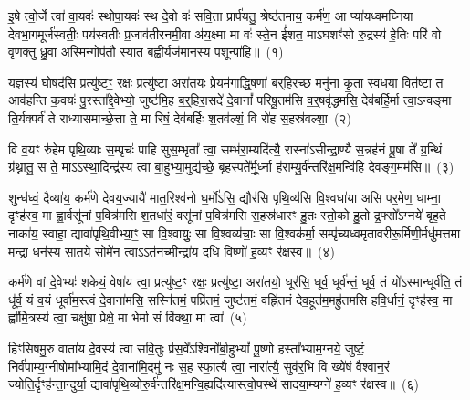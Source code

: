 \setcounter{anuvakam}{0}
इ॒षे त्वो॒र्जे त्वा॑ वा॒यवः॑ स्थोपा॒यवः॑ स्थ दे॒वो वः॑ सवि॒ता प्रार्प॑यतु॒ श्रेष्ठ॑तमाय॒ कर्म॑ण॒ आ प्या॑यध्वमघ्निया देवभा॒गमूर्ज॑स्वतीः॒ पय॑स्वतीः प्र॒जाव॑तीरनमी॒वा अ॑य॒क्ष्मा मा वः॑ स्ते॒न ई॑शत॒ मा\-ऽघशꣳ॑सो रु॒द्रस्य॑ हे॒तिः परि॑ वो वृणक्तु ध्रु॒वा अ॒स्मिन्गोप॑तौ स्यात ब॒ह्वीर्यज॑मानस्य प॒शून्पा॑हि॥~(१)

{\anuvakamend[{इ॒षे त्रिच॑त्वारिꣳशत्}]}

य॒ज्ञस्य॑ घो॒षद॑सि॒ प्रत्यु॑ष्ट॒ꣳ॒ रक्षः॒ प्रत्यु॑ष्टा॒ अरा॑तयः॒ प्रेयम॑गाद्धि॒षणा॑ ब॒र्॒हिरच्छ॒ मनु॑ना कृ॒ता स्व॒धया॒ वित॑ष्टा॒ त आव॑हन्ति क॒वयः॑ पु॒रस्ता᳚द्दे॒वेभ्यो॒ जुष्ट॑मि॒ह ब॒र्॒हिरा॒सदे॑ दे॒वानां᳚ परिषू॒तम॑सि व॒र्॒षवृ॑द्धमसि॒ देव॑बर्\mbox{}हि॒र्मा त्वा॒\-ऽन्वङ्मा ति॒र्यक्पर्व॑ ते राध्यासमाच्छे॒त्ता ते॒ मा रि॑षं॒ देव॑बर्\mbox{}हिः श॒तव॑ल्\mbox{}शं॒ वि रो॑ह स॒हस्र॑वल्\mbox{}शा॒~(२)

वि व॒यꣳ रु॑हेम पृथि॒व्याः स॒म्पृचः॑ पाहि सुस॒म्भृता᳚ त्वा॒ सम्भ॑रा॒म्यदि॑त्यै॒ रास्ना॑\-ऽसीन्द्रा॒ण्यै स॒न्नह॑नं पू॒षा ते᳚ ग्र॒न्थिं ग्र॑थ्नातु॒ स ते॒ मा\-ऽऽ\-स्था॒दिन्द्र॑स्य त्वा बा॒हुभ्या॒मुद्य॑च्छे॒ बृह॒स्पते᳚र्मू॒र्ध्ना ह॑राम्यु॒र्व॑न्तरि॑क्ष॒मन्वि॑हि देवङ्ग॒मम॑सि॥~(३)

{\anuvakamend[{स॒हस्र॑वल्\mbox{}शा अ॒ष्टात्रिꣳ॑शच्च}]}

शुन्ध॑ध्वं॒ दैव्या॑य॒ कर्म॑णे देवय॒ज्यायै॑ मात॒रिश्व॑नो घ॒र्मो॑\-ऽसि॒ द्यौर॑सि पृथि॒व्य॑सि वि॒श्वधा॑या असि पर॒मेण॒ धाम्ना॒ दृꣳह॑स्व॒ मा ह्वा॒र्वसू॑नां प॒वित्र॑मसि श॒तधा॑रं॒ वसू॑नां प॒वित्र॑मसि स॒हस्र॑धारꣳ हु॒तः स्तो॒को हु॒तो द्र॒फ्सो᳚\-ऽग्नये॑ बृह॒ते नाका॑य॒ स्वाहा॒ द्यावा॑\-पृथि॒वीभ्या॒ꣳ॒ सा वि॒श्वायुः॒ सा वि॒श्वव्य॑चाः॒ सा वि॒श्वक॑र्मा॒ सम्पृ॑च्यध्वमृतावरीरू॒र्मिणी॒र्मधु॑मत्तमा म॒न्द्रा धन॑स्य सा॒तये॒ सोमे॑न॒ त्वा\-ऽऽ\-त॑न॒च्मीन्द्रा॑य॒ दधि॒ विष्णो॑ ह॒व्यꣳ र॑क्षस्व॥~(४)

{\anuvakamend[{सोमे॑ना॒ष्टौ च॑}]}

कर्म॑णे वां दे॒वेभ्यः॑ शकेयं॒ वेषा॑य त्वा॒ प्रत्यु॑ष्ट॒ꣳ॒ रक्षः॒ प्रत्यु॑ष्टा॒ अरा॑तयो॒ धूर॑सि॒ धूर्व॒ धूर्व॑न्तं॒ धूर्व॒ तं यो᳚\-ऽस्मान्धूर्व॑ति॒ तं धू᳚र्व॒ यं व॒यं धूर्वा॑म॒स्त्वं दे॒वाना॑मसि॒ सस्नि॑तमं॒ पप्रि॑तमं॒ जुष्ट॑तमं॒ वह्नि॑तमं देव॒हूत॑म॒मह्रु॑तमसि हवि॒र्धानं॒ दृꣳह॑स्व॒ मा ह्वा᳚र्मि॒त्रस्य॑ त्वा॒ चक्षु॑षा॒ प्रेक्षे॒ मा भेर्मा सं वि॑क्था॒ मा त्वा॑~(५)

हिꣳसिषमु॒रु वाता॑य दे॒वस्य॑ त्वा सवि॒तुः प्र॑स॒वे᳚\-ऽश्विनो᳚र्बा॒हु\-भ्यां᳚ पू॒ष्णो हस्ता᳚भ्याम॒ग्नये॒ जुष्टं॒ निर्व॑पाम्य॒ग्नी\-षोमा᳚भ्यामि॒दं दे॒वाना॑मि॒दमु॑ नः स॒ह स्फा॒त्यै त्वा॒ नारा᳚त्यै॒ सुव॑र॒भि वि ख्ये॑षं वैश्वान॒रं ज्योति॒र्दृꣳह॑न्ता॒न्दुर्या॒ द्यावा॑\-पृथि॒व्योरु॒र्व॑न्तरि॑क्ष॒\-मन्वि॒ह्यदि॑त्यास्त्वो॒\-पस्थे॑ सादया॒म्यग्ने॑ ह॒व्यꣳ र॑क्षस्व॥~(६)

